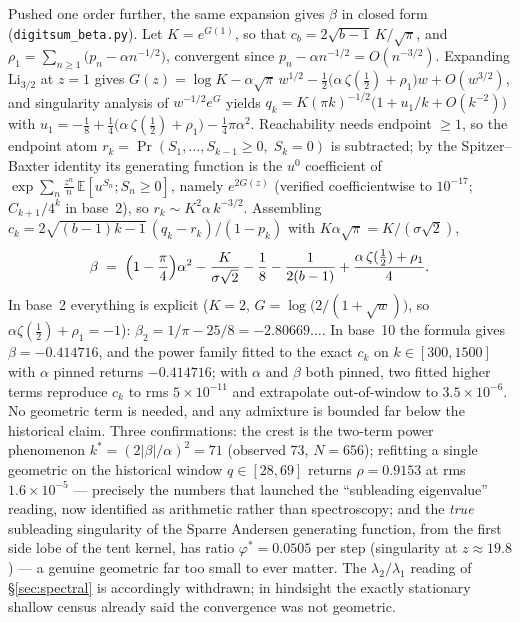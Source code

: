 \documentclass[11pt]{article}
\theoremstyle{definition}
\theoremstyle{remark}
\begin{document}
Pushed one order further, the same expansion gives $\beta$ in closed form
(\texttt{digitsum\_beta.py}). Let $K=e^{G(1)}$, so that
$c_b=2\sqrt{b-1}\,K/\sqrt{\pi}$, and
$\rho_1=\sum_{n\ge1}\bigl(p_n-\alpha n^{-1/2}\bigr)$, convergent since
$p_n-\alpha n^{-1/2}=O(n^{-3/2})$. Expanding $\mathrm{Li}_{3/2}$ at $z=1$
gives $G(z)=\log K-\alpha\sqrt{\pi}\,w^{1/2}
-\tfrac12\bigl(\alpha\,\zeta(\tfrac12)+\rho_1\bigr)w+O(w^{3/2})$, and
singularity analysis of $w^{-1/2}e^{G}$ yields
$q_k=K(\pi k)^{-1/2}\bigl(1+u_1/k+O(k^{-2})\bigr)$ with
$u_1=-\tfrac18+\tfrac14\bigl(\alpha\,\zeta(\tfrac12)+\rho_1\bigr)
-\tfrac14\pi\alpha^2$. Reachability needs endpoint $\ge1$, so the endpoint
atom $r_k=\Pr(S_1,\dots,S_{k-1}\ge0,\;S_k=0)$ is subtracted; by the
Spitzer--Baxter identity its generating function is the $u^0$ coefficient of
$\exp\sum_n\frac{z^n}{n}\,\mathbb{E}[u^{S_n};S_n\ge0]$, namely $e^{2G(z)}$
(verified coefficientwise to $10^{-17}$; $C_{k+1}/4^k$ in base~2), so
$r_k\sim K^2\alpha\,k^{-3/2}$. Assembling
$c_k=2\sqrt{(b-1)k-1}\,(q_k-r_k)/(1-p_k)$ with
$K\alpha\sqrt{\pi}=K/(\sigma\sqrt2)$,
\[
\beta\;=\;\Bigl(1-\frac{\pi}{4}\Bigr)\alpha^2-\frac{K}{\sigma\sqrt2}
-\frac18-\frac{1}{2(b-1)}+\frac{\alpha\,\zeta(\frac12)+\rho_1}{4}.
\]
In base~2 everything is explicit ($K=2$, $G=\log\bigl(2/(1+\sqrt{w})\bigr)$,
so $\alpha\zeta(\frac12)+\rho_1=-1$): $\beta_2=1/\pi-25/8=-2.80669\ldots$.
In base~10 the formula gives $\beta=-0.414716$, and the power family fitted
to the exact $c_k$ on $k\in[300,1500]$ with $\alpha$ pinned returns
$-0.414716$; with $\alpha$ and $\beta$ both pinned, two fitted higher terms
reproduce $c_k$ to rms $5\times10^{-11}$ and extrapolate out-of-window to
$3.5\times10^{-6}$. No geometric term is
needed, and any admixture is bounded far below the historical claim. Three
confirmations: the crest is the two-term power
phenomenon $k^*=(2|\beta|/\alpha)^2=71$ (observed $73$, $N=656$); refitting a
single geometric on the historical window $q\in[28,69]$ returns
$\rho=0.9153$ at rms $1.6\times10^{-5}$ --- precisely the numbers that launched
the ``subleading eigenvalue'' reading, now identified as arithmetic rather than
spectroscopy; and the \emph{true} subleading singularity of the Sparre Andersen
generating function, from the first side lobe of the tent kernel, has ratio
$\varphi^*=0.0505$ per step (singularity at $z\approx19.8$) --- a genuine
geometric far too small to ever matter. The $\lambda_2/\lambda_1$ reading of
\S\ref{sec:spectral} is accordingly withdrawn; in hindsight the exactly
stationary shallow census already said the convergence was not geometric.
\end{document}
